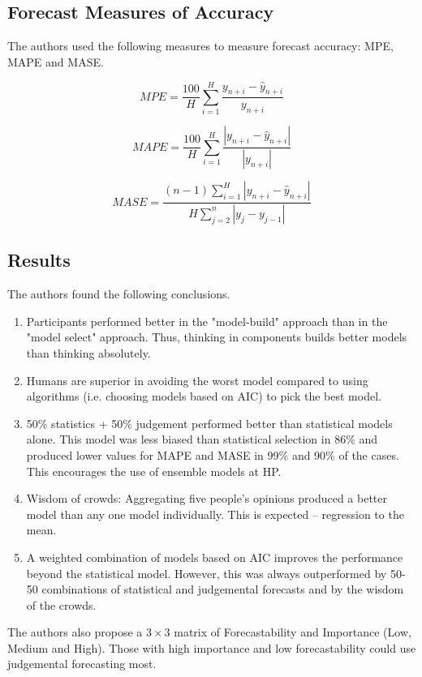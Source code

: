 \documentclass[12pt]{article}
\begin{document}
\subsection{Forecast Measures of Accuracy}

The authors used the following measures to measure forecast accuracy: MPE, MAPE and MASE.

\begin{equation}
	MPE = \frac{100}{H} \sum_{i = 1}^H \frac{y_{n + i} - \hat{y}_{n + i}}{y_{n+i}}
\end{equation}

\begin{equation}
	MAPE = \frac{100}{H} \sum_{i = 1}^H \frac{|y_{n+i} - \hat{y}_{n + i}|}{|y_{n + i}|}
\end{equation}

\begin{equation}
	MASE = \frac{(n-1) \sum_{i = 1}^H |y_{n + i} - \hat{y}_{n + i}|}{H \sum_{j = 2}^n |y_j - y_{j-1}|}
\end{equation}

\subsection{Results}

The authors found the following conclusions.

\begin{enumerate}
	\item Participants performed better in the "model-build" approach than in the "model select" approach. Thus, thinking in components builds better models than thinking absolutely.
	\item Humans are superior in avoiding the worst model compared to using algorithms (i.e. choosing models based on AIC) to pick the best model.
	\item 50\% statistics + 50\% judgement performed better than statistical models alone. This model was less biased than statistical selection in 86\% and produced lower values for MAPE and MASE in 99\% and 90\% of the cases. This encourages the use of ensemble models at HP.
	\item Wisdom of crowds: Aggregating five people's opinions produced a better model than any one model individually. This is expected -- regression to the mean.
	\item A weighted combination of models based on AIC improves the performance beyond the statistical model. However, this was always outperformed by 50-50 combinations of statistical and judgemental forecasts and by the wisdom of the crowds.
\end{enumerate}


The authors also propose a $3 \times 3$ matrix of Forecastability and Importance (Low, Medium and High). Those with high importance and low forecastability could use judgemental forecasting most.


\newpage



\end{document}
